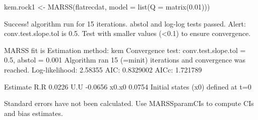 \begin{Schunk}
\begin{Sinput}
 kem.rock1 <- MARSS(flatrecdat, model = list(Q = matrix(0.01)))
\end{Sinput}
\begin{Soutput}
Success! algorithm run for 15 iterations. abstol and log-log tests passed.
Alert: conv.test.slope.tol is 0.5.
Test with smaller values (<0.1) to ensure convergence.

MARSS fit is
Estimation method: kem 
Convergence test: conv.test.slope.tol = 0.5, abstol = 0.001
Algorithm ran 15 (=minit) iterations and convergence was reached. 
Log-likelihood: 2.58355 
AIC: 0.8329002   AICc: 1.721789   
 
      Estimate
R.R     0.0226
U.U    -0.0656
x0.x0   0.0754
Initial states (x0) defined at t=0

Standard errors have not been calculated. 
Use MARSSparamCIs to compute CIs and bias estimates.
\end{Soutput}
\end{Schunk}
